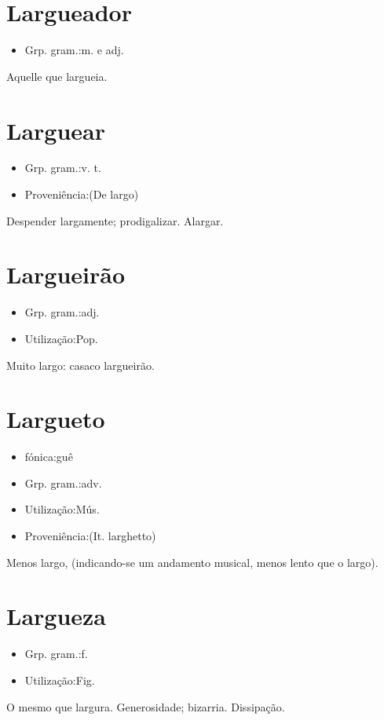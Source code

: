 \section{Largueador}
\begin{itemize}
\item {Grp. gram.:m.  e  adj.}
\end{itemize}
Aquelle que largueia.
\section{Larguear}
\begin{itemize}
\item {Grp. gram.:v. t.}
\end{itemize}
\begin{itemize}
\item {Proveniência:(De \textunderscore largo\textunderscore )}
\end{itemize}
Despender largamente; prodigalizar.
Alargar.
\section{Largueirão}
\begin{itemize}
\item {Grp. gram.:adj.}
\end{itemize}
\begin{itemize}
\item {Utilização:Pop.}
\end{itemize}
Muito largo: \textunderscore casaco largueirão\textunderscore .
\section{Largueto}
\begin{itemize}
\item {fónica:guê}
\end{itemize}
\begin{itemize}
\item {Grp. gram.:adv.}
\end{itemize}
\begin{itemize}
\item {Utilização:Mús.}
\end{itemize}
\begin{itemize}
\item {Proveniência:(It. \textunderscore larghetto\textunderscore )}
\end{itemize}
Menos largo, (indicando-se um andamento musical, menos lento que o largo).
\section{Largueza}
\begin{itemize}
\item {Grp. gram.:f.}
\end{itemize}
\begin{itemize}
\item {Utilização:Fig.}
\end{itemize}
O mesmo que \textunderscore largura\textunderscore .
Generosidade; bizarria.
Dissipação.
